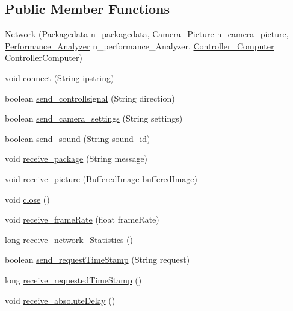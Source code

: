 \subsection*{Public Member Functions}
\begin{DoxyCompactItemize}
\item 
\hyperlink{class_controller_1_1_network_a52d633081ad026685640af5b3803884f}{Network} (\hyperlink{class_controller_1_1_packagedata}{Packagedata} n\+\_\+packagedata, \hyperlink{class_controller_1_1_camera___picture}{Camera\+\_\+\+Picture} n\+\_\+camera\+\_\+picture, \hyperlink{class_controller_1_1_performance___analyzer}{Performance\+\_\+\+Analyzer} n\+\_\+performance\+\_\+\+Analyzer, \hyperlink{class_controller_1_1_controller___computer}{Controller\+\_\+\+Computer} Controller\+Computer)
\item 
void \hyperlink{class_controller_1_1_network_ae67ed03163a7a45ab5d76e375121f6f0}{connect} (String ipstring)
\item 
boolean \hyperlink{class_controller_1_1_network_a418b97d15f7ac480cdf77e24fcdc3ec1}{send\+\_\+controllsignal} (String direction)
\item 
boolean \hyperlink{class_controller_1_1_network_a880c5afa94e996a62e78f969dce79d1a}{send\+\_\+camera\+\_\+settings} (String settings)
\item 
boolean \hyperlink{class_controller_1_1_network_a0cd2bef3e6087ab3ab39d28b4a57db35}{send\+\_\+sound} (String sound\+\_\+id)
\item 
void \hyperlink{class_controller_1_1_network_a2cef6cf1398d5697328314fc33589315}{receive\+\_\+package} (String message)
\item 
void \hyperlink{class_controller_1_1_network_a124b367a9c620d675753ec40c6de9ddc}{receive\+\_\+picture} (Buffered\+Image buffered\+Image)
\item 
void \hyperlink{class_controller_1_1_network_a2d118b1d89fa5c949ed4f77a54b53536}{close} ()
\item 
void \hyperlink{class_controller_1_1_network_ad1be957b9e2d12a1450be8b323178ad7}{receive\+\_\+frame\+Rate} (float frame\+Rate)
\item 
long \hyperlink{class_controller_1_1_network_a8c5523e2678152b450977e707cce3848}{receive\+\_\+network\+\_\+\+Statistics} ()
\item 
boolean \hyperlink{class_controller_1_1_network_ad8f331a6f51fe194e78294c53cb019ee}{send\+\_\+request\+Time\+Stamp} (String request)
\item 
long \hyperlink{class_controller_1_1_network_a0e6669d614f56f54891acfa3c4ea99dd}{receive\+\_\+requested\+Time\+Stamp} ()
\item 
void \hyperlink{class_controller_1_1_network_a88c1d505e5b01fc3320c53613e869eb4}{receive\+\_\+absolute\+Delay} ()
\end{DoxyCompactItemize}


